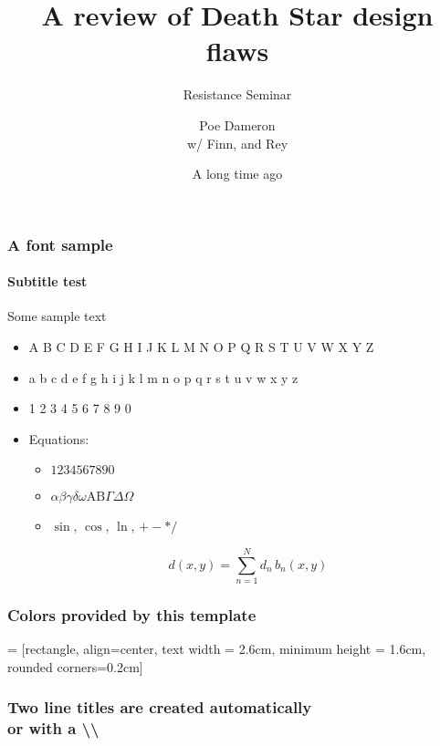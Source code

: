\documentclass{beamer}
\title{A review of Death Star design flaws}
\subtitle{Resistance Seminar}
\author{Poe Dameron \\ \vspace{5pt} \scriptsize w/ Finn, and Rey}
\institute[]{\texttt{[image: bhaumikLogo]}}
\date{A long time ago}
\begin{document}
\begin{frame}
  \titlepage
\end{frame}


\begin{frame} 
\frametitle{A font sample} 
\framesubtitle{Subtitle test} 
Some sample text
\begin{itemize}
	\item A B C D E F G H I J K L M N O P Q R S T U V W X Y Z
	\item a b c d e f g h i j k l m n o p q r s t u v w x y z
	\item 1 2 3 4 5 6 7 8 9 0
	\item Equations:
	\begin{itemize}
		\item $1 2 3 4 5 6 7 8 9 0$
		\item $\alpha \beta \gamma \delta \omega \text{A} \text{B} \Gamma \Delta \Omega$
		\item $\sin$, $\cos$, $\ln$, $+ - * /$
	\end{itemize}
	\begin{equation}
		d\left( x, y \right) = \sum_{n=1}^N d_n \, b_n \left( x, y \right)
	\end{equation}
\end{itemize}
\end{frame}



\begin{frame}[fragile]
\frametitle{Colors provided by this template}
\centering
{} = [rectangle,
                               align=center, 
                               text width = 2.6cm,
                               minimum height = 1.6cm,
                               rounded corners=0.2cm]
                               
\newcommand{\colorSampleNode}[2]{
    \node[colorSampleNodeTemplate, fill=#1, text=#2] 
        {#1\\\HTMLcolor{#1}};
        }


\end{frame}



\begin{frame} 
\frametitle{Two line titles are created automatically\\or with a \textbackslash\textbackslash}  
\lipsum[1]
\end{frame}


\insertLastSlide
\end{document}
